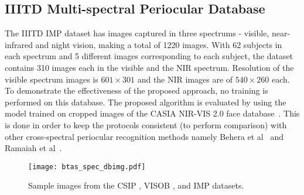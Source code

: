 \documentclass[10pt,twocolumn,letterpaper]{article}
\begin{document}
\subsection{IIITD Multi-spectral Periocular Database}
  \vspace{-4pt}
The IIITD IMP dataset \cite{sharma2014cross} has images captured in three spectrums - visible, near-infrared and night vision, making a total of 1220 images. With 62 subjects in each spectrum and 5 different images corresponding to each subject, the dataset contains 310 images each in the visible and the NIR spectrum. Resolution of the visible spectrum images is $601 \times 301$ and the NIR images are of $540 \times 260$ each. To demonstrate the effectiveness of the proposed approach, no training is performed on this database. The proposed algorithm is evaluated by using the model trained on cropped images of the CASIA NIR-VIS 2.0 face database~\cite{li2013casia}. This is done in order to keep the protocols consistent (to perform comparison) with other cross-spectral periocular recognition methods namely Behera et al~\cite{behera2017periocular} and Ramaiah et al~\cite{ramaiah2016matching}. 
\begin{figure}
  \centering
  \texttt{[image: btas\_spec\_dbimg.pdf]}
    \vspace{-8pt}
  \caption{Sample images from the CSIP \cite{santos2015fusing}, VISOB \cite{VISOB_Dataset}, and IMP \cite{sharma2014cross} datasets.}
    \vspace{-12pt}
  \label{fig:eg_imgs}
 \end{figure} 
 \vspace{-8pt}
\end{document}
